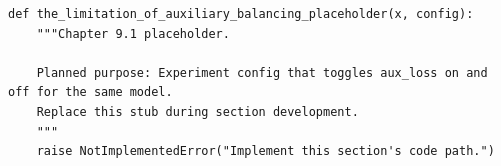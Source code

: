 \begin{lstlisting}[style=bookpython,caption={Planned code placeholder for the limitation of auxiliary balancing.},label={lst:ch09-the-limitation-of-auxiliary-balancing}]
def the_limitation_of_auxiliary_balancing_placeholder(x, config):
    """Chapter 9.1 placeholder.

    Planned purpose: Experiment config that toggles aux_loss on and off for the same model.
    Replace this stub during section development.
    """
    raise NotImplementedError("Implement this section's code path.")
\end{lstlisting}
